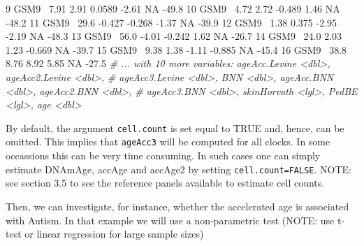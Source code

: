 \documentclass[]{article}
\newcommand{\hlnum}[1]{\textcolor[rgb]{0.816,0.125,0.439}{#1}}%
\newcommand{\hlstr}[1]{\textcolor[rgb]{0.251,0.627,0.251}{#1}}%
\newcommand{\hlcom}[1]{\textcolor[rgb]{0.502,0.502,0.502}{\textit{#1}}}%
\newcommand{\hlopt}[1]{\textcolor[rgb]{0,0,0}{#1}}%
\newcommand{\hlstd}[1]{\textcolor[rgb]{0.251,0.251,0.251}{#1}}%
\newenvironment{Shaded}{\begin{myshaded}}{\end{myshaded}}
\newcommand{\DecValTok}[1]{\hlnum{#1}}
\newcommand{\FloatTok}[1]{\hlnum{#1}}
\newcommand{\StringTok}[1]{\hlstr{#1}}
\newcommand{\CommentTok}[1]{\hlcom{#1}}
\newcommand{\OtherTok}[1]{{#1}}
\newcommand{\OperatorTok}[1]{\hlopt{#1}}
\newcommand{\NormalTok}[1]{\hlstd{#1}}
\begin{document}
\begin{Shaded}
\begin{Highlighting}[]
   \DecValTok{9}\NormalTok{ GSM9}\OperatorTok{~}\StringTok{    }\FloatTok{7.91}          \FloatTok{2.91}           \FloatTok{0.0589}          \FloatTok{-2.61}  \OtherTok{NA}      \FloatTok{-49.8}
  \DecValTok{10}\NormalTok{ GSM9}\OperatorTok{~}\StringTok{    }\FloatTok{4.72}          \FloatTok{2.72}          \FloatTok{-0.489}            \FloatTok{1.46}  \OtherTok{NA}      \FloatTok{-48.2}
  \DecValTok{11}\NormalTok{ GSM9}\OperatorTok{~}\StringTok{   }\FloatTok{29.6}          \FloatTok{-0.427}         \FloatTok{-0.268}           \FloatTok{-1.37}  \OtherTok{NA}      \FloatTok{-39.9}
  \DecValTok{12}\NormalTok{ GSM9}\OperatorTok{~}\StringTok{    }\FloatTok{1.38}          \FloatTok{0.375}         \FloatTok{-2.95}            \FloatTok{-2.19}  \OtherTok{NA}      \FloatTok{-48.3}
  \DecValTok{13}\NormalTok{ GSM9}\OperatorTok{~}\StringTok{   }\FloatTok{56.0}          \FloatTok{-4.01}          \FloatTok{-0.242}            \FloatTok{1.62}  \OtherTok{NA}      \FloatTok{-26.7}
  \DecValTok{14}\NormalTok{ GSM9}\OperatorTok{~}\StringTok{   }\FloatTok{24.0}           \FloatTok{2.03}           \FloatTok{1.23}            \FloatTok{-0.669} \OtherTok{NA}      \FloatTok{-39.7}
  \DecValTok{15}\NormalTok{ GSM9}\OperatorTok{~}\StringTok{    }\FloatTok{9.38}          \FloatTok{1.38}          \FloatTok{-1.11}            \FloatTok{-0.885} \OtherTok{NA}      \FloatTok{-45.4}
  \DecValTok{16}\NormalTok{ GSM9}\OperatorTok{~}\StringTok{   }\FloatTok{38.8}           \FloatTok{8.76}           \FloatTok{8.92}             \FloatTok{5.85}  \OtherTok{NA}      \FloatTok{-27.5}
  \CommentTok{# ... with 10 more variables: ageAcc.Levine <dbl>, ageAcc2.Levine <dbl>,}
  \CommentTok{#   ageAcc3.Levine <dbl>, BNN <dbl>, ageAcc.BNN <dbl>, ageAcc2.BNN <dbl>,}
  \CommentTok{#   ageAcc3.BNN <dbl>, skinHorvath <lgl>, PedBE <lgl>, age <dbl>}
\end{Highlighting}
\end{Shaded}

By default, the argument \texttt{cell.count} is set equal to TRUE and, hence, can be omitted. This implies that \texttt{ageAcc3} will be computed for all clocks. In some occassions this can be very time consuming. In such cases one can simply estimate DNAmAge, accAge and accAge2 by setting \texttt{cell.count=FALSE}. NOTE: see section 3.5 to see the reference panels available to estimate cell counts.

Then, we can investigate, for instance, whether the accelerated age is associated with Autism. In that example we will use a non-parametric test (NOTE: use t-test or linear regression for large sample sizes)
\end{document}
